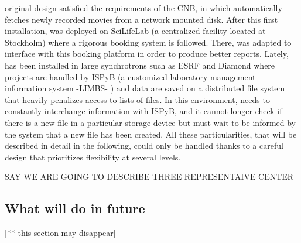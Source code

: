 \scipion original design satisfied the requirements of the CNB, in which \scipion automatically fetches newly recorded movies from a network mounted disk. After this first installation, \scipion was deployed on SciLifeLab (a centralized facility located at Stockholm) where a rigorous booking system is followed. There, \scipion was adapted to interface with this booking platform in order to produce better reports. Lately,  \scipion has been installed in  large synchrotrons  such as ESRF and Diamond  where projects are handled by ISPyB (a customized laboratory management information system -LIMBS- \citep{Delageniere2011}) and data are saved on a distributed file system that heavily penalizes access to lists of files. In this environment, \scipion needs to constantly interchange information with ISPyB, and it cannot longer check if there is a new file in a particular storage device but must wait to be informed by the system that a new file has been created. All these particularities, that will be described in detail in the following, could only be handled thanks to a careful design that prioritizes flexibility at several levels. 

SAY WE ARE GOING TO DESCRIBE THREE REPRESENTAIVE CENTER






\subsection{What will do in future}
[** this section may disappear] 


